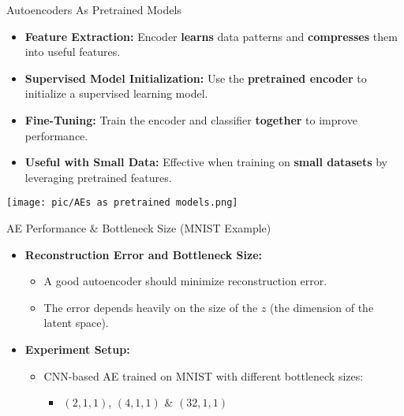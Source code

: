 \documentclass[serif, aspectratio=169]{beamer}
\begin{document}
\begin{frame}{Autoencoders As Pretrained Models}
    \scriptsize
    \begin{itemize}
        \item \textbf{Feature Extraction:} Encoder \textbf{learns} data patterns and \textbf{compresses} them into useful features.
        \item \textbf{Supervised Model Initialization:} Use the \textbf{pretrained encoder} to initialize a supervised learning model.
        \item \textbf{Fine-Tuning:} Train the encoder and classifier \textbf{together} to improve performance.
        \item \textbf{Useful with Small Data:} Effective when training on \textbf{small datasets} by leveraging pretrained features.
    \end{itemize}
    
    \begin{center}
        \texttt{[image: pic/AEs as pretrained models.png]} 
    \end{center}
\end{frame}

\begin{frame}{AE Performance \& Bottleneck Size (MNIST Example)}
    \begin{itemize}
        \item \textbf{Reconstruction Error and Bottleneck Size:}
        \begin{itemize}
            \item A good autoencoder should minimize reconstruction error.
            \item The error depends heavily on the size of the \( z \) (the dimension of the latent space).
        \end{itemize}
        
        \item \textbf{Experiment Setup:}
        \begin{itemize}
            \item CNN-based AE trained on MNIST with different bottleneck sizes:
            \begin{itemize}
                \item \((2, 1, 1)\), \((4, 1, 1)\) \& \((32, 1, 1)\)
            \end{itemize} 
        \end{itemize}
    \end{itemize}
\end{frame}
\end{document}
